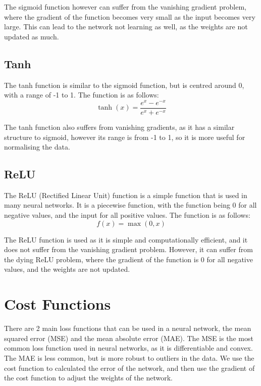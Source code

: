 \documentclass{report}
\begin{document}
The sigmoid function however can suffer from the vanishing gradient problem, where the gradient of the function becomes very small as the input becomes very large.
This can lead to the network not learning as well, as the weights are not updated as much.

\subsection{Tanh}
The tanh function is similar to the sigmoid function, but is centred around 0, with a range of -1 to 1.
The function is as follows:
\begin{equation}
    \tanh(x) = \frac{e^{x} - e^{-x}}{e^{x} + e^{-x}}
\end{equation}

The tanh function also suffers from vanishing gradients, as it has a similar structure to sigmoid, however its range is from -1 to 1, so it is more useful for normalising the data.

\subsection{ReLU}
The ReLU (Rectified Linear Unit) function is a simple function that is used in many neural networks.
It is a piecewise function, with the function being 0 for all negative values, and the input for all positive values.
The function is as follows:
\begin{equation}
    f(x) = \max(0, x)
\end{equation}

The ReLU function is used as it is simple and computationally efficient, and it does not suffer from the vanishing gradient problem.
However, it can suffer from the dying ReLU problem, where the gradient of the function is 0 for all negative values, and the weights are not updated.



\section{Cost Functions}

There are 2 main loss functions that can be used in a neural network, the mean squared error (MSE) and the mean absolute error (MAE). 
The MSE is the most common loss function used in neural networks, as it is differentiable and convex.
The MAE is less common, but is more robust to outliers in the data.
\vspace{1em}
\newline
We use the cost function to calculated the error of the network, and then use the gradient of the cost function to adjust the weights of the network.
\end{document}
